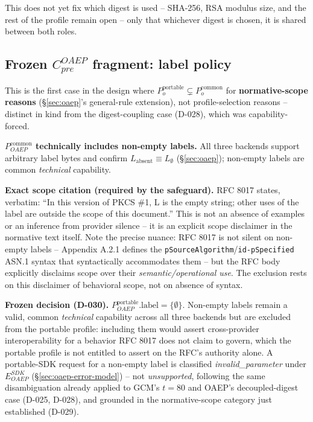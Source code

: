 \documentclass[11pt,a4paper]{article}
\begin{document}
This does not yet fix which digest is used -- SHA-256, RSA modulus size, and the rest of the profile remain open -- only that whichever digest is chosen, it is shared between both roles.

\subsection{Frozen $C_{pre}^{OAEP}$ fragment: label policy}\label{sec:oaep-label}
This is the first case in the design where $P_o^{\text{portable}} \subsetneq P_o^{\text{common}}$ for \textbf{normative-scope reasons} (\S\ref{sec:oaep}'s general-rule extension), not profile-selection reasons -- distinct in kind from the digest-coupling case (D-028), which was capability-forced.

\textbf{$P_{OAEP}^{\text{common}}$ technically includes non-empty labels.} All three backends support arbitrary label bytes and confirm $L_{\text{absent}} \equiv L_{\emptyset}$ (\S\ref{sec:oaep}); non-empty labels are common \emph{technical} capability.

\textbf{Exact scope citation (required by the safeguard).} RFC 8017 states, verbatim: ``In this version of PKCS \#1, L is the empty string; other uses of the label are outside the scope of this document.'' This is not an absence of examples or an inference from provider silence -- it is an explicit scope disclaimer in the normative text itself. Note the precise nuance: RFC 8017 is not silent on non-empty labels -- Appendix A.2.1 defines the \texttt{pSourceAlgorithm}/\texttt{id-pSpecified} ASN.1 syntax that syntactically accommodates them -- but the RFC body explicitly disclaims scope over their \emph{semantic/operational use}. The exclusion rests on this disclaimer of behavioral scope, not on absence of syntax.

\textbf{Frozen decision (D-030).} $P_{OAEP}^{\text{portable}}.\text{label} = \{\emptyset\}$. Non-empty labels remain a valid, common \emph{technical} capability across all three backends but are excluded from the portable profile: including them would assert cross-provider interoperability for a behavior RFC 8017 does not claim to govern, which the portable profile is not entitled to assert on the RFC's authority alone. A portable-SDK request for a non-empty label is classified \emph{invalid\_parameter} under $E_{OAEP}^{SDK}$ (\S\ref{sec:oaep-error-model}) -- not \emph{unsupported}, following the same disambiguation already applied to GCM's $t=80$ and OAEP's decoupled-digest case (D-025, D-028), and grounded in the normative-scope category just established (D-029).
\end{document}

